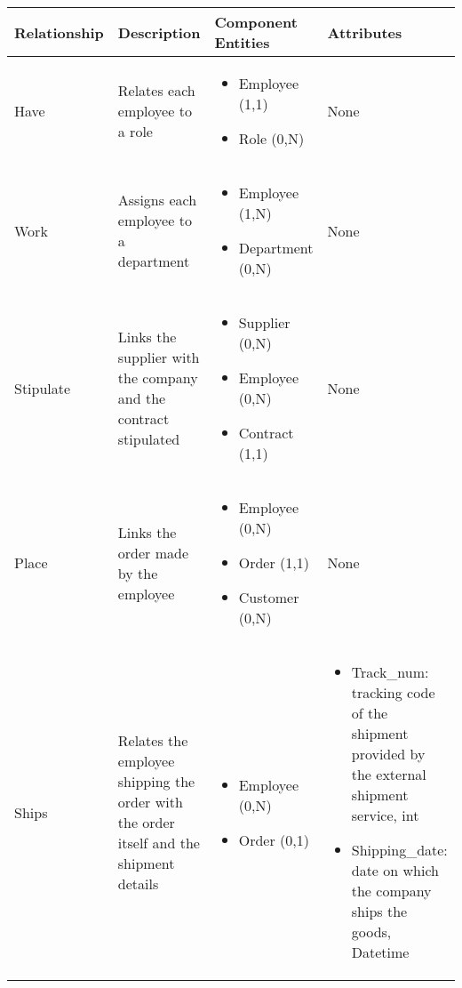 \begin{longtable}{|p{}|p{} |p{}|p{} |} 
\hline
\textbf{Relationship} & \textbf{Description} & \textbf{Component Entities} & \textbf{Attributes} \\\hline


Have & Relates each employee to a role & \begin{itemize}
        \vspace{-1em}
        \item Employee (1,1)
        \item Role (0,N)
    \end{itemize}
 &  None \\\hline
 
Work & Assigns each employee to a department & \begin{itemize}
        \vspace{-1em}
        \item Employee (1,N)
        \item Department (0,N)
    \end{itemize}
 &  None \\\hline

Stipulate & Links the supplier with the company and the contract stipulated  & \begin{itemize}
	\vspace{-1em}
	\item Supplier (0,N) 
	\item Employee (0,N)
    \item Contract  (1,1)
	\end{itemize}
&  None\\\hline

Place & Links the order made by the employee & \begin{itemize}
	\vspace{-1em}
	\item Employee (0,N)
	\item Order (1,1)
	\item Customer (0,N)	
\end{itemize}
&  None \\\hline

Ships & Relates the employee shipping the order with the order itself and the shipment details &
\begin{itemize}
	\vspace{-1em}
	\item Employee (0,N)
	\item Order (0,1)
\end{itemize}
&
 \begin{itemize}
 	\vspace{-1em}
 	\item Track\_num:   tracking code of the shipment provided by the external shipment service, int
 	\item Shipping\_date:   date on which the company ships the goods, Datetime
 \end{itemize}
 \\\hline


\end{longtable}

